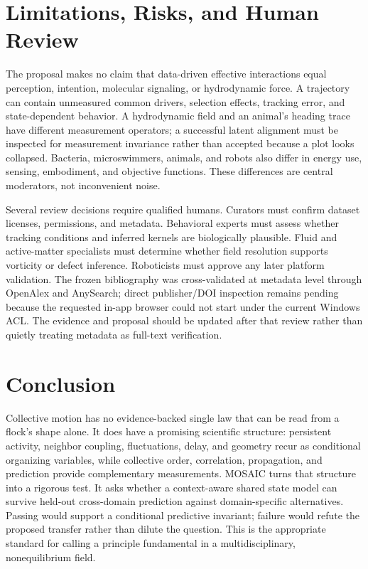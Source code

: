 \documentclass[conference]{../../../../Conference-LaTeX-template_10-17-19/IEEEtran}
\begin{document}
\section{Limitations, Risks, and Human Review}
The proposal makes no claim that data-driven effective interactions equal perception, intention, molecular signaling, or hydrodynamic force. A trajectory can contain unmeasured common drivers, selection effects, tracking error, and state-dependent behavior. A hydrodynamic field and an animal's heading trace have different measurement operators; a successful latent alignment must be inspected for measurement invariance rather than accepted because a plot looks collapsed. Bacteria, microswimmers, animals, and robots also differ in energy use, sensing, embodiment, and objective functions. These differences are central moderators, not inconvenient noise.

Several review decisions require qualified humans. Curators must confirm dataset licenses, permissions, and metadata. Behavioral experts must assess whether tracking conditions and inferred kernels are biologically plausible. Fluid and active-matter specialists must determine whether field resolution supports vorticity or defect inference. Roboticists must approve any later platform validation. The frozen bibliography was cross-validated at metadata level through OpenAlex and AnySearch; direct publisher/DOI inspection remains pending because the requested in-app browser could not start under the current Windows ACL. The evidence and proposal should be updated after that review rather than quietly treating metadata as full-text verification.

\section{Conclusion}
Collective motion has no evidence-backed single law that can be read from a flock's shape alone. It does have a promising scientific structure: persistent activity, neighbor coupling, fluctuations, delay, and geometry recur as conditional organizing variables, while collective order, correlation, propagation, and prediction provide complementary measurements. MOSAIC turns that structure into a rigorous test. It asks whether a context-aware shared state model can survive held-out cross-domain prediction against domain-specific alternatives. Passing would support a conditional predictive invariant; failure would refute the proposed transfer rather than dilute the question. This is the appropriate standard for calling a principle fundamental in a multidisciplinary, nonequilibrium field.
\end{document}

